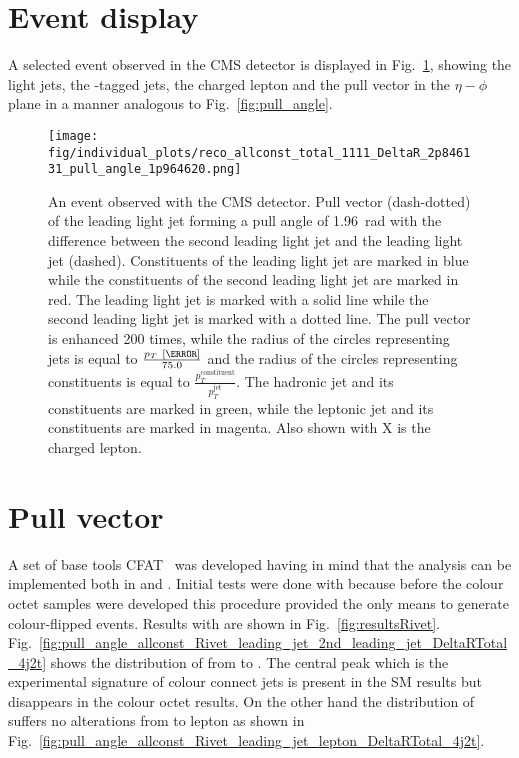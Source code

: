 \section{Event display}
A selected event observed in the CMS detector is displayed in Fig.~\ref{fig:event_display}, showing the light jets, the \cPqb-tagged jets, the charged lepton and the pull vector in the $\eta-\phi$ plane in a manner analogous to Fig.~\ref{fig:pull_angle}.

\begin{figure}[hbtp]
  \centering
  \texttt{[image: fig/individual\_plots/reco\_allconst\_total\_1111\_DeltaR\_2p846131\_pull\_angle\_1p964620.png]}
  \caption{An event observed with the CMS detector. Pull vector (dash-dotted) of the leading light jet forming a pull angle of 1.96~rad with the difference between the second leading light jet and the leading light jet (dashed). Constituents of the leading light jet are marked in blue while the constituents of the second leading light jet are marked in red. The leading light jet is marked with a solid line while the second leading light jet is marked with a dotted line. The pull vector is enhanced 200 times, while the radius of the circles representing jets is equal to $\frac{p_{T}~[\GeV]}{75.0}$ and the radius of the circles representing constituents is equal to $\frac{p^{\text{constituent}}_{T}}{p^{\text{jet}}_{T}}$. The hadronic \cPqb jet and its constituents are marked in green, while the leptonic \cPqb jet and its constituents are marked in magenta. Also shown with X is the charged lepton.}
  \label{fig:event_display}
\end{figure}

\section{Pull vector}

A set of base tools \textsc{CFAT}~\cite{url:cfat} was developed having in mind that the analysis can be implemented both in \RIVET and \CMSSW. Initial tests were done with \RIVET because before the colour octet \PW samples were developed this procedure provided the only means to generate colour-flipped events. Results with \RIVET are shown in Fig.~\ref{fig:resultsRivet}. Fig.~\ref{fig:pull_angle_allconst_Rivet_leading_jet_2nd_leading_jet_DeltaRTotal_4j2t} shows the distribution of \pullangle from \leadingjet to \scndleadingjet. The central peak which is the experimental signature of colour connect jets is present in the SM results but disappears in the \PW colour octet results. On the other hand the distribution of \pullangle suffers no alterations from \leadingjet to lepton as shown in Fig.~\ref{fig:pull_angle_allconst_Rivet_leading_jet_lepton_DeltaRTotal_4j2t}.

